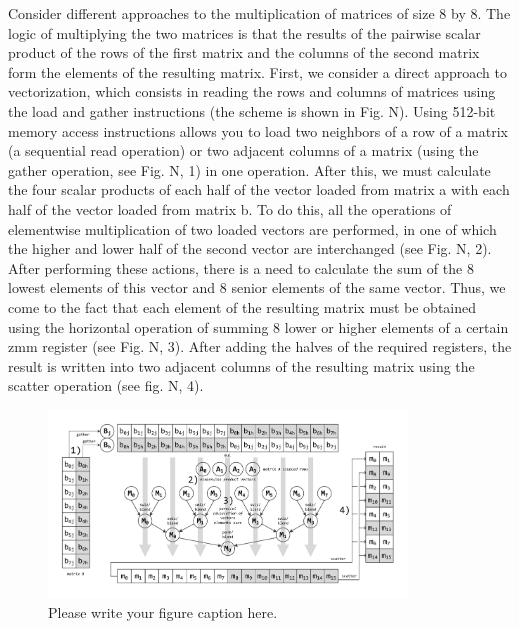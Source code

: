 \documentclass[
11pt,%
tightenlines,%
twoside,%
onecolumn,%
nofloats,%
nobibnotes,%
nofootinbib,%
superscriptaddress,%
noshowpacs,%
centertags]%
{revtex4}
\begin{document}
Consider different approaches to the multiplication of matrices of size 8 by 8. The logic of multiplying the two matrices is that the results of the pairwise scalar product of the rows of the first matrix and the columns of the second matrix form the elements of the resulting matrix. First, we consider a direct approach to vectorization, which consists in reading the rows and columns of matrices using the load and gather instructions (the scheme is shown in Fig. N). Using 512-bit memory access instructions allows you to load two neighbors of a row of a matrix (a sequential read operation) or two adjacent columns of a matrix (using the gather operation, see Fig. N, 1) in one operation. After this, we must calculate the four scalar products of each half of the vector loaded from matrix a with each half of the vector loaded from matrix b. To do this, all the operations of elementwise multiplication of two loaded vectors are performed, in one of which the higher and lower half of the second vector are interchanged (see Fig. N, 2). After performing these actions, there is a need to calculate the sum of the 8 lowest elements of this vector and 8 senior elements of the same vector. Thus, we come to the fact that each element of the resulting matrix must be obtained using the horizontal operation of summing 8 lower or higher elements of a certain zmm register (see Fig. N, 3). After adding the halves of the required registers, the result is written into two adjacent columns of the resulting matrix using the scatter operation (see fig. N, 4).

\begin{figure}[h]
\setcaptionmargin{5mm}
\onelinecaptionstrue  %
\includegraphics[width=0.85\textwidth]{pics/mmult_1.pdf}
\caption{Please write your figure caption here.}\label{fig:1}
\end{figure}
\end{document}
